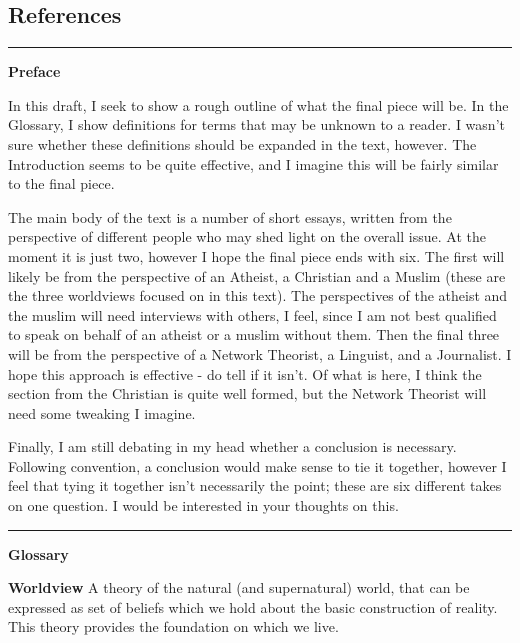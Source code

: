 \documentclass[]{article}
\date{}
\begin{document}
\tableofcontents
\subsection{References}
\nocite{*} 
\printbibliography[heading=none]

\begin{center}\rule{0.5\linewidth}{\linethickness}\end{center}

\textbf{Preface}

In this draft, I seek to show a rough outline of what the final piece
will be. In the Glossary, I show definitions for terms that may be
unknown to a reader. I wasn't sure whether these definitions should be
expanded in the text, however. The Introduction seems to be quite
effective, and I imagine this will be fairly similar to the final piece.

The main body of the text is a number of short essays, written from the
perspective of different people who may shed light on the overall issue.
At the moment it is just two, however I hope the final piece ends with
six. The first will likely be from the perspective of an Atheist, a
Christian and a Muslim (these are the three worldviews focused on in
this text). The perspectives of the atheist and the muslim will need
interviews with others, I feel, since I am not best qualified to speak
on behalf of an atheist or a muslim without them. Then the final three
will be from the perspective of a Network Theorist, a Linguist, and a
Journalist. I hope this approach is effective - do tell if it isn't. Of
what is here, I think the section from the Christian is quite well
formed, but the Network Theorist will need some tweaking I imagine.

Finally, I am still debating in my head whether a conclusion is
necessary. Following convention, a conclusion would make sense to tie it
together, however I feel that tying it together isn't necessarily the
point; these are six different takes on one question. I would be
interested in your thoughts on this.

\begin{center}\rule{0.5\linewidth}{\linethickness}\end{center}

\textbf{Glossary}

\textbf{Worldview} A theory of the natural (and supernatural) world,
that can be expressed as set of beliefs which we hold about the basic
construction of reality. This theory provides the foundation on which we
live.
\end{document}
